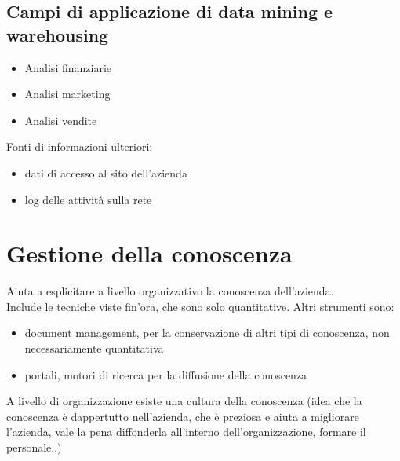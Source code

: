 \subsection{Campi di applicazione di data mining e
warehousing}\label{campi-di-applicazione-di-data-mining-e-warehousing}

\begin{itemize}

\item
  Analisi finanziarie
\item
  Analisi marketing
\item
  Analisi vendite
\end{itemize}

Fonti di informazioni ulteriori:

\begin{itemize}

\item
  dati di accesso al sito dell'azienda
\item
  log delle attivit\`a sulla rete
\end{itemize}

\section{Gestione della conoscenza}\label{gestione-della-conoscenza}

Aiuta a esplicitare a livello organizzativo la conoscenza dell'azienda.\\
Include le tecniche viste fin'ora, che sono solo quantitative. Altri strumenti sono:

\begin{itemize}

\item
  document management, per la conservazione di altri tipi di conoscenza,
  non necessariamente quantitativa
\item
  portali, motori di ricerca per la diffusione della conoscenza
\end{itemize}

A livello di organizzazione esiste una cultura della conoscenza (idea
che la conoscenza \`e dappertutto nell'azienda, che \`e preziosa e aiuta a
migliorare l'azienda, vale la pena diffonderla all'interno
dell'organizzazione, formare il personale..)

